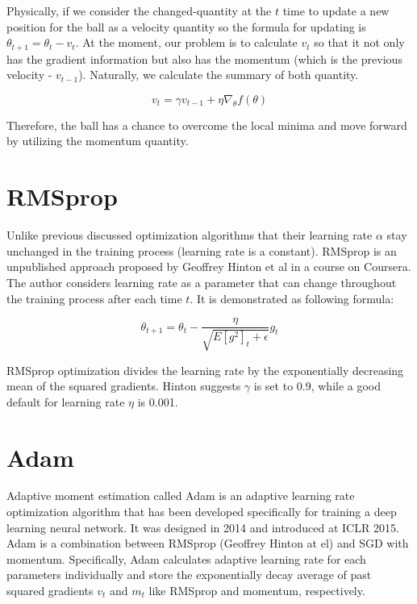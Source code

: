 	Physically, if we consider the changed-quantity at the $t$ time to update a new position for the ball as a velocity quantity so the formula for updating is $ \theta_{t+1} = \theta_t - v_t $. At the moment, our problem is to calculate $v_t$ so that it not only has the gradient information but also has the momentum (which is the previous velocity - $v_{t-1}$). Naturally, we calculate the summary of both quantity.
	
	\[ v_t = \gamma v_{t-1} + \eta\nabla_{\theta}f(\theta)\] 
	
	Therefore, the ball has a chance to overcome the local minima and move forward by utilizing the momentum quantity.

\section{RMSprop}
\label{section:rmsprop}
\noindent

	Unlike previous discussed optimization algorithms that their learning rate $\alpha$ stay unchanged in the training process (learning rate is a constant). RMSprop \cite{gdoverview} is an unpublished approach proposed by Geoffrey Hinton et al in a course on Coursera. The author considers learning rate as a parameter that can change throughout the training process after each time $t$. It is demonstrated as following formula:
	
	\[ \theta_{t+1} = \theta_t - \frac{\eta}{\sqrt{E[g^2]_t + \epsilon}}g_t \]
	
	RMSprop optimization divides the learning rate by the exponentially decreasing mean of the squared gradients. Hinton suggests $\gamma$ is set to 0.9, while a good default for learning rate $\eta$ is 0.001.
	
\section{Adam}
\label{section:adam}
\noindent
	
	Adaptive moment estimation called Adam \cite{gdoverview} \cite{adam} is an adaptive learning rate optimization algorithm that has been developed specifically for training a deep learning neural network. It was designed in 2014 and introduced at ICLR 2015. Adam is a combination between RMSprop (Geoffrey Hinton at el) and SGD with momentum. Specifically, Adam calculates adaptive learning rate for each parameters individually and store the exponentially decay average of past squared gradients $v_t$ and $m_t$ like RMSprop and momentum, respectively.
	

